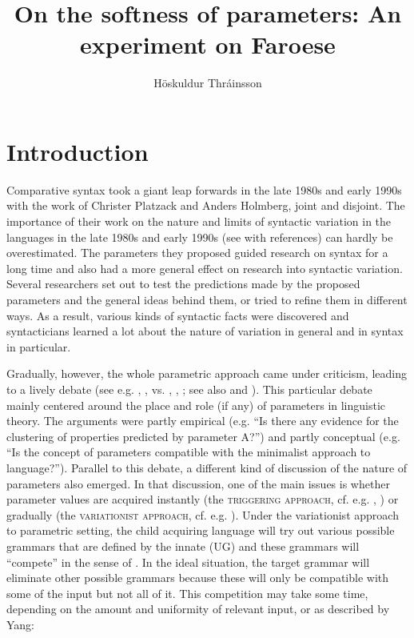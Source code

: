 \documentclass[output=paper]{LSP/langsci}
\author{Höskuldur Thráinsson\affiliation{University of Iceland}}
\title{On the softness of parameters: An experiment on Faroese}
\begin{document}



\section{Introduction}\label{sec:Thrainsson:1}
Comparative  syntax took a giant leap forwards in the late 1980s and early 1990s with the work of Christer Platzack and Anders Holmberg, joint and disjoint. The importance of their work on the nature and limits of syntactic variation in the  languages in the late 1980s and early 1990s (see \citealt{Holmplat1995} with references) can hardly be overestimated. The parameters they proposed guided research on  syntax for a long time and also had a more general effect on research into syntactic variation. Several researchers set out to test the predictions made by the proposed parameters and the general ideas behind them, or tried to refine them in different ways. As a result, various kinds of syntactic facts were discovered and syntacticians learned a lot about the nature of variation in general and in  syntax in particular.

Gradually, however, the whole parametric approach came under criticism, leading to a lively debate (see e.g. \citealt{Newmeyer2004,Newmeyer2005,Newmeyer2006}, \citealt{Haspelmath2008}, \citealt{Boeckx2011} vs. \citealt{Holmberg2010parameters}, \citealt{HolmbergEtAl2009}, \citealt{Roberts2005}; see also \citealt{BerwickEtAl2011} and \citealt{Sigurðsson2011Uniformity}). This particular debate mainly centered around the place and role (if any) of parameters in linguistic theory. The arguments were partly empirical (e.g. “Is there any evidence for the clustering of properties predicted by parameter A?”) and partly conceptual (e.g. “Is the concept of parameters compatible with the minimalist approach to language?”). Parallel to this debate, a different kind of discussion of the nature of parameters also emerged. In that discussion, one of the main issues is whether parameter values are acquired instantly (the \textsc{triggering approach}, cf. e.g. \citealt{Gibson1994}, \citealt{Lightfoot1999}) or gradually (the \textsc{variationist approach}, cf. e.g. \citealt{Yang2002,Yang2004,Yang2010}). Under the variationist approach to parametric setting, the child acquiring language will try out various possible grammars that are defined by the innate  (UG) and these grammars will “compete” in the sense of \citet{Kroch1989,Kroch2001}. In the ideal situation, the target grammar will eliminate other possible grammars because these will only be compatible with some of the input but not all of it. This competition may take some time, depending on the amount and uniformity of relevant input, or as described by Yang:
\end{document}
